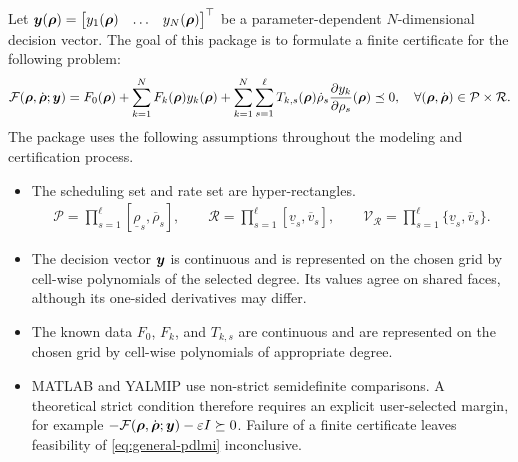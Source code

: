 Let $\boldsymbol{y}(\boldsymbol{\rho})=\begin{bmatrix}
    y_1(\boldsymbol{\rho})&\ldots&y_N(\boldsymbol{\rho})
\end{bmatrix}^\top$ be a parameter-dependent $N$-dimensional decision vector. The goal of this package is to formulate a finite certificate for the following  problem:
\begin{gather}
    \mathcal F(\boldsymbol{\rho},\dot{\boldsymbol{\rho}};\boldsymbol{y})
    =F_0(\boldsymbol{\rho})
    +\sum_{k=1}^{N}F_k(\boldsymbol{\rho})y_k(\boldsymbol{\rho})+\sum_{k=1}^{N}\sum_{s=1}^{\ell}
    T_{k,s}(\boldsymbol{\rho})\dot\rho_s
    \frac{\partial y_k}{\partial\rho_s}(\boldsymbol{\rho})
    \preceq0,
    \quad
    \forall(\boldsymbol{\rho},\dot{\boldsymbol{\rho}})\in\mathcal P\times\mathcal R.
    \label{eq:general-pdlmi}
\end{gather}
The package uses the following assumptions throughout the modeling and certification process.
\begin{itemize}
    \item The scheduling set and rate set are hyper-rectangles.
          \begin{gather*}
              \mathcal P=\prod_{s=1}^{\ell}[\underline\rho_s,\overline\rho_s],
              \qquad
              \mathcal R=\prod_{s=1}^{\ell}[\underline v_s,\overline v_s],
              \qquad
              \mathcal V_{\mathcal R}
              =\prod_{s=1}^{\ell}\{\underline v_s,\overline v_s\}.
          \end{gather*}
    \item The decision vector $\boldsymbol{y}$ is continuous and is represented on the chosen grid by cell-wise polynomials of the selected degree. Its values agree on shared faces, although its one-sided derivatives may differ.
    \item The known data $F_0$, $F_k$, and $T_{k,s}$ are continuous and are represented on the chosen grid by cell-wise polynomials of appropriate degree.
    \item MATLAB and YALMIP use non-strict semidefinite comparisons. A theoretical strict condition therefore requires an explicit user-selected margin, for example $-\mathcal F(\boldsymbol{\rho},\dot{\boldsymbol{\rho}};\boldsymbol{y})-\varepsilon I\succeq0$. Failure of a finite certificate leaves feasibility of \cref{eq:general-pdlmi} inconclusive.
\end{itemize}

